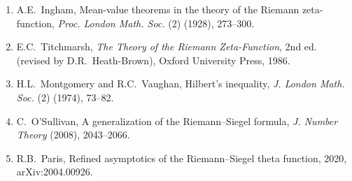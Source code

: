 \documentclass{article}
\newcommand{\tmem}[1]{{\em #1\/}}
\newcommand{\tmtextbf}[1]{\text{{\bfseries{#1}}}}
\begin{document}
\begin{enumerate}
  \item A.{\hspace{0.17em}}E.~Ingham, Mean-value theorems in the theory of the
  Riemann zeta-function, {\tmem{Proc. London Math. Soc.}} (2) \tmtextbf{27}
  (1928), 273--300.
  
  \item E.{\hspace{0.17em}}C.~Titchmarsh, {\tmem{The Theory of the Riemann
  Zeta-Function}}, 2nd ed. (revised by D.{\hspace{0.17em}}R.~Heath-Brown),
  Oxford University Press, 1986.
  
  \item H.{\hspace{0.17em}}L.~Montgomery and R.{\hspace{0.17em}}C.~Vaughan,
  Hilbert's inequality, {\tmem{J. London Math. Soc.}} (2) \tmtextbf{8} (1974),
  73--82.
  
  \item C.~O'Sullivan, A generalization of the Riemann--Siegel formula,
  {\tmem{J. Number Theory}} \tmtextbf{128} (2008), 2043--2066.
  
  \item R.{\hspace{0.17em}}B.~Paris, Refined asymptotics of the
  Riemann--Siegel theta function, 2020, arXiv:2004.00926.
\end{enumerate}
\end{document}

